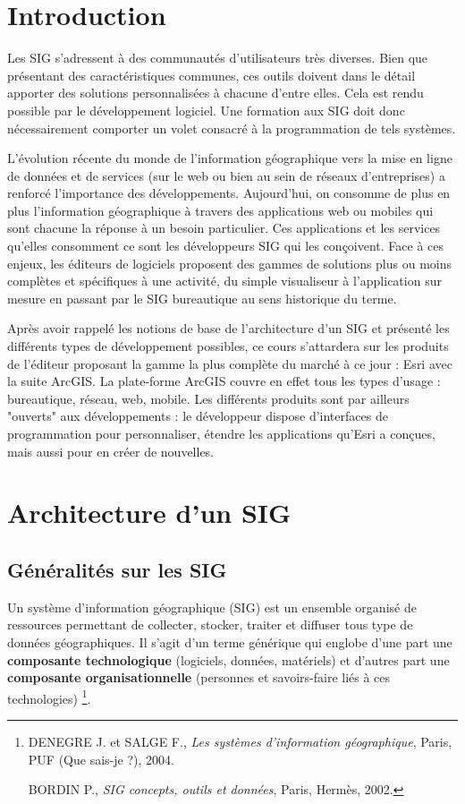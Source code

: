 \documentclass[11pt]{article}
\begin{document}
\tableofcontents
\newpage



\section{Introduction}
Les SIG s'adressent à des communautés d'utilisateurs très diverses. Bien que présentant des caractéristiques communes, ces outils doivent dans le détail apporter des solutions personnalisées à chacune d'entre elles. Cela est rendu possible par le développement logiciel. Une formation aux SIG doit donc nécessairement comporter un volet consacré à la programmation de tels systèmes.

L'évolution récente du monde de l'information géographique vers la mise en ligne de données et de services (sur le web ou bien au sein de réseaux d'entreprises) a renforcé l'importance des développements. Aujourd'hui, on consomme de plus en plus l'information géographique à travers des applications web ou mobiles qui sont chacune la réponse à un besoin particulier. Ces applications et les services qu'elles consomment ce sont les développeurs SIG qui les conçoivent.
Face à ces enjeux, les éditeurs de logiciels proposent des gammes de solutions plus ou moins complètes et spécifiques à une activité, du simple visualiseur à l'application sur mesure en passant par le SIG bureautique au sens historique du terme. 

Après avoir rappelé les notions de base de l'architecture d'un SIG et présenté les différents types de développement possibles, ce cours s'attardera sur les produits de l'éditeur proposant la gamme la plus complète du marché à ce jour : Esri avec la suite ArcGIS. La plate-forme ArcGIS couvre en effet tous les types d'usage : bureautique, réseau, web, mobile. Les différents produits sont par ailleurs "ouverts" aux développements : le développeur dispose d'interfaces de programmation pour personnaliser, étendre les applications qu'Esri a conçues, mais aussi pour en créer de nouvelles.
\newpage


\section{Architecture d'un SIG}

\subsection{Généralités sur les SIG}
Un système d'information géographique (SIG) est un ensemble organisé de ressources permettant de collecter, stocker, traiter et diffuser tous type de données géographiques. Il s'agit d'un terme générique qui englobe d'une part une \textbf{composante technologique} (logiciels, données, matériels) et d'autres part une \textbf{composante organisationnelle} (personnes et savoirs-faire liés à ces technologies)
\footnote{DENEGRE J. et SALGE F., \textit{Les systèmes d'information géographique}, Paris, PUF (Que sais-je ?), 2004.

BORDIN P., \textit{SIG concepts, outils et données}, Paris, Hermès, 2002.}.
\end{document}
